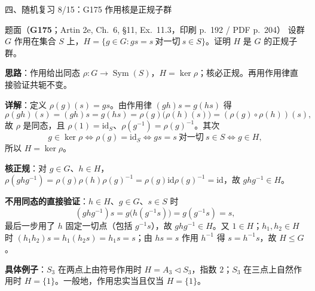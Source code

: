\documentclass[aspectratio=169,10pt,fontset=none]{ctexbeamer}
\newcommand{\ex}[1]{\textcolor{accent}{\footnotesize\bfseries #1}}
\newcommand{\key}[1]{\textcolor{ink}{\bfseries #1}}
\begin{document}
\begin{frame}[t]{四、随机复习 8/15：G175 作用核是正规子群}
\label{ex:G175}
\scriptsize
\begin{block}{\footnotesize 题面（\ex{G175}；Artin 2e, Ch.~6, §11, Ex.~11.3，印刷 p.~192 / PDF p.~204）}
设群 $G$ 作用在集合 $S$ 上，$H=\{g\in G:gs=s\ \text{对一切}\ s\in S\}$。证明 $H$ 是 $G$ 的正规子群。
\end{block}
\key{思路}：作用给出同态 $\rho:G\to\operatorname{Sym}(S)$，$H=\ker\rho$；核必正规。再用作用律直接验证共轭不变。

\key{详解}：定义 $\rho(g)(s)=gs$。由作用律 $(gh)s=g(hs)$ 得
\[ \rho(gh)(s)=(gh)s=g(hs)=\rho(g)\bigl(\rho(h)(s)\bigr)=(\rho(g)\circ\rho(h))(s), \]
故 $\rho$ 是同态，且 $\rho(1)=\mathrm{id}_S$、$\rho(g^{-1})=\rho(g)^{-1}$。其次
\[ g\in\ker\rho\iff\rho(g)=\mathrm{id}_S\iff gs=s\ \text{对一切}\ s\in S\iff g\in H, \]
所以 $H=\ker\rho$。

\key{核正规}：对 $g\in G$、$h\in H$，$\rho(ghg^{-1})=\rho(g)\rho(h)\rho(g)^{-1}=\rho(g)\mathrm{id}\rho(g)^{-1}=\mathrm{id}$，故 $ghg^{-1}\in H$。

\key{不用同态的直接验证}：$h\in H$、$g\in G$、$s\in S$ 时
\[ (ghg^{-1})s=g\bigl(h(g^{-1}s)\bigr)=g(g^{-1}s)=s, \]
最后一步用了 $h$ 固定一切点（包括 $g^{-1}s$），故 $ghg^{-1}\in H$。又 $1\in H$；$h_1,h_2\in H$ 时 $(h_1h_2)s=h_1(h_2s)=h_1s=s$；由 $hs=s$ 作用 $h^{-1}$ 得 $s=h^{-1}s$，故 $H\le G$。

\key{具体例子}：$S_3$ 在两点上由符号作用时 $H=A_3\triangleleft S_3$，指数 $2$；$S_3$ 在三点上自然作用时 $H=\{1\}$。一般地，作用忠实当且仅当 $H=\{1\}$。
\end{frame}
\end{document}
